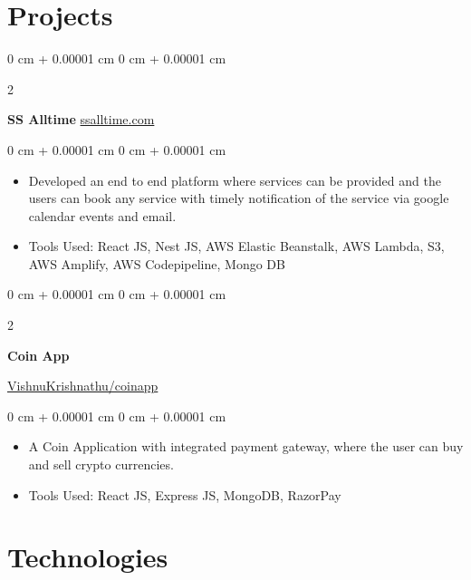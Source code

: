 \documentclass[10pt, letterpaper]{article}
\newenvironment{highlights}{
    \begin{itemize}[
        topsep=0.10 cm,
        parsep=0.10 cm,
        partopsep=0pt,
        itemsep=0pt,
        leftmargin=0 cm + 10pt
    ]
}{
    \end{itemize}
} %
\newenvironment{onecolentry}{
    \begin{adjustwidth}{
        0 cm + 0.00001 cm
    }{
        0 cm + 0.00001 cm
    }
}{
    \end{adjustwidth}
} %
\newenvironment{twocolentry}[2][]{
    \onecolentry
    \def\secondColumn{#2}
    \setcolumnwidth{\fill, 4.5 cm}
    \begin{paracol}{2}
}{
    \switchcolumn \raggedleft \secondColumn
    \end{paracol}
    \endonecolentry
} %
\begin{document}
    

    \section{Projects}



        
        \begin{twocolentry}{
            \href{https://ssalltime.com}{ssalltime.com}
        }
            \textbf{SS Alltime}\end{twocolentry}

        \vspace{0.10 cm}
        \begin{onecolentry}
            \begin{highlights}
                \item Developed an end to end platform where services can be provided and the users can book any service with timely notification of the service via google calendar events and email.
                \item Tools Used: React JS, Nest JS, AWS Elastic Beanstalk, AWS Lambda, S3, AWS Amplify, AWS Codepipeline, Mongo DB
            \end{highlights}
        \end{onecolentry}


        \vspace{0.2 cm}

        \begin{twocolentry}{
            \href{https://vishnukrishnathu.github.io/coinapp/}{VishnuKrishnathu/coinapp}
        }
            \textbf{Coin App}
        \end{twocolentry}

        \vspace{0.10 cm}
        \begin{onecolentry}
            \begin{highlights}
                \item A Coin Application with integrated payment gateway, where the user can buy and sell crypto currencies.
                \item Tools Used: React JS, Express JS, MongoDB, RazorPay
            \end{highlights}
        \end{onecolentry}


        \vspace{0.2 cm}
    
    \section{Technologies}
\end{document}
